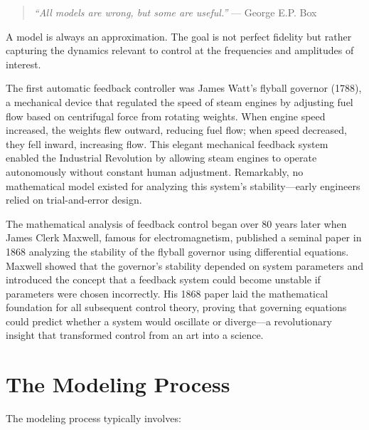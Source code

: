 \begin{quote}
\textit{``All models are wrong, but some are useful.''} --- George E.P. Box
\end{quote}

A model is always an approximation. The goal is not perfect fidelity but rather capturing the dynamics relevant to control at the frequencies and amplitudes of interest.

\begin{historicalbox}[title=Historical Context: Watt's Flyball Governor and Early Feedback Control]
The first automatic feedback controller was James Watt's flyball governor (1788), a mechanical device that regulated the speed of steam engines by adjusting fuel flow based on centrifugal force from rotating weights. When engine speed increased, the weights flew outward, reducing fuel flow; when speed decreased, they fell inward, increasing flow. This elegant mechanical feedback system enabled the Industrial Revolution by allowing steam engines to operate autonomously without constant human adjustment. Remarkably, no mathematical model existed for analyzing this system's stability---early engineers relied on trial-and-error design.

The mathematical analysis of feedback control began over 80 years later when James Clerk Maxwell, famous for electromagnetism, published a seminal paper in 1868 analyzing the stability of the flyball governor using differential equations. Maxwell showed that the governor's stability depended on system parameters and introduced the concept that a feedback system could become unstable if parameters were chosen incorrectly. His 1868 paper laid the mathematical foundation for all subsequent control theory, proving that governing equations could predict whether a system would oscillate or diverge---a revolutionary insight that transformed control from an art into a science.
\end{historicalbox}

\section{The Modeling Process}



The modeling process typically involves:

